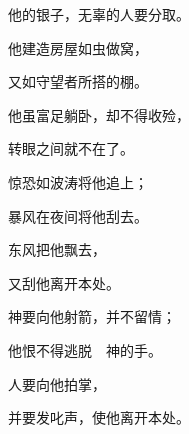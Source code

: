 {\par }{\Q 他的银子，无辜的人要分取。
\par }{\Q {}他建造房屋如虫做窝，
\par }{\Q 又如守望者所搭的棚。
\par }{\Q {}他虽富足躺卧，却不得收殓，
\par }{\Q 转眼之间就不在了。
\par }{\Q {}惊恐如波涛将他追上；
\par }{\Q 暴风在夜间将他刮去。
\par }{\Q {}东风把他飘去，
\par }{\Q 又刮他离开本处。
\par }{\Q {}神要向他射箭，并不留情；
\par }{\Q 他恨不得逃脱　神的手。
\par }{\Q {}人要向他拍掌，
\par }{\Q 并要发叱声，使他离开本处。

}
